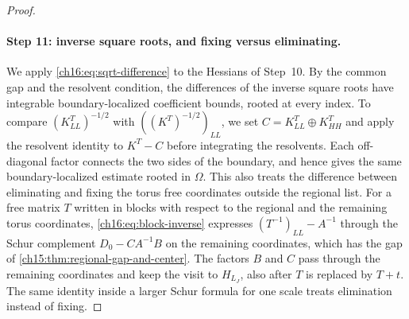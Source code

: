 \begin{proof}
\paragraph{Step 11: inverse square roots, and fixing versus eliminating.}
We apply \eqref{ch16:eq:sqrt-difference} to the Hessians of Step~10. By the common gap and the resolvent condition, the differences of the inverse square roots have integrable boundary-localized coefficient bounds, rooted at every index. To compare $(K^T_{LL})^{-1/2}$ with $((K^T)^{-1/2})_{LL}$, we set $C=K^T_{LL}\oplus K^T_{HH}$ and apply the resolvent identity to $K^T-C$ before integrating the resolvents. Each off-diagonal factor connects the two sides of the boundary, and hence gives the same boundary-localized estimate rooted in $\Omega$. This also treats the difference between eliminating and fixing the torus free coordinates outside the regional list. For a free matrix $T$ written in blocks with respect to the regional and the remaining torus coordinates, \eqref{ch16:eq:block-inverse} expresses $(T^{-1})_{LL}-A^{-1}$ through the Schur complement $D_0-CA^{-1}B$ on the remaining coordinates, which has the gap of \cref{ch15:thm:regional-gap-and-center}. The factors $B$ and $C$ pass through the remaining coordinates and keep the visit to $H_{L_J}$, also after $T$ is replaced by $T+t$. The same identity inside a larger Schur formula for one scale treats elimination instead of fixing.


\end{proof}
